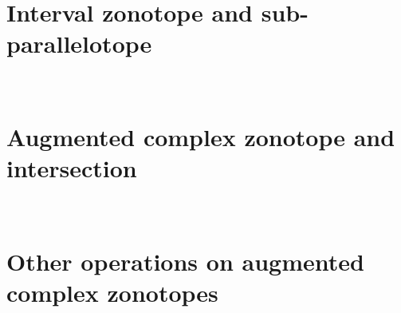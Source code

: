 

\section{Interval zonotope and sub-parallelotope}~\label{sec:iztope}
 

\section{Augmented complex zonotope and intersection}~\label{sec:acz-it}
 

\section{Other operations on augmented complex zonotopes}~\label{sec:operations-acz}

